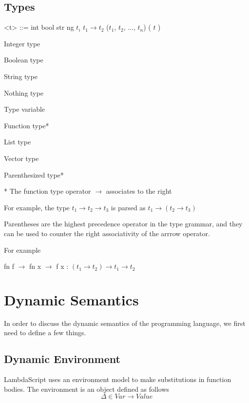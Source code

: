 \documentclass[titlepage]{article}
\begin{document}
\subsection{Types}
\begin{minipage}[t]{0.5\textwidth}
\begin{grammar}
<t> ::= int
\alt bool
\alt str
\alt ng
\alt $t_i$
\alt $t_1 \rightarrow t_2$
\alt ($t_1$, $t_2$, ..., $t_n$)
\alt ( $t$ )
\end{grammar}
\end{minipage}%
\begin{minipage}[t]{0.5\textwidth}
  Integer type

  Boolean type

  String type

  Nothing type

  Type variable

  Function type*

  List type

  Vector type

  Parenthesized type*
  \end{minipage}%

\vspace{0.25in}
* The function type operator $\rightarrow$ associates to the right

For example, the type $t_1 \rightarrow t_2 \rightarrow t_3$ is parsed as $t_1 \rightarrow (t_2 \rightarrow t_3)$

Parentheses are the highest precedence operator in the type grammar, and they can be used to counter the right associativity of the arrrow operator.

For example

\begin{center}

fn f $\rightarrow$ fn x $\rightarrow$ f x : $(t_1 \rightarrow t_2) \rightarrow t_1 \rightarrow t_2$

\end{center}



\newpage
\section{Dynamic Semantics}

In order to discuss the dynamic semantics of the programming language, we first need to
define a few things.


\subsection{Dynamic Environment}
LambdaScript uses an environment model to make substitutions in function bodies. The environment is an object defined as follows
$$\Delta \in Var  \rightarrow Value$$
\end{document}
